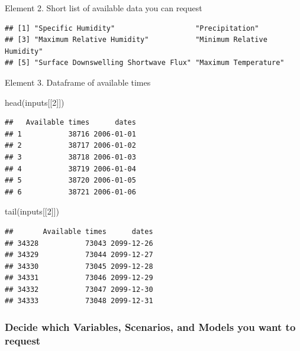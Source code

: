 \documentclass[
  paper=a4,
  ,captions=tableheading
]{scrartcl}
\newenvironment{Shaded}{\begin{snugshade}}{\end{snugshade}}
\newcommand{\DecValTok}[1]{\textcolor[rgb]{0.00,0.00,0.81}{#1}}
\newcommand{\FunctionTok}[1]{\textcolor[rgb]{0.00,0.00,0.00}{#1}}
\newcommand{\NormalTok}[1]{#1}
\newcommand{\SpecialCharTok}[1]{\textcolor[rgb]{0.00,0.00,0.00}{#1}}
\begin{document}
Element 2. Short list of available data you can request

\begin{Shaded}
\end{Shaded}

\begin{verbatim}
## [1] "Specific Humidity"                   "Precipitation"                      
## [3] "Maximum Relative Humidity"           "Minimum Relative Humidity"          
## [5] "Surface Downswelling Shortwave Flux" "Maximum Temperature"
\end{verbatim}

Element 3. Dataframe of available times

\begin{Shaded}
\begin{Highlighting}[]
\FunctionTok{head}\NormalTok{(inputs[[}\DecValTok{2}\NormalTok{]])}
\end{Highlighting}
\end{Shaded}

\begin{verbatim}
##   Available times      dates
## 1           38716 2006-01-01
## 2           38717 2006-01-02
## 3           38718 2006-01-03
## 4           38719 2006-01-04
## 5           38720 2006-01-05
## 6           38721 2006-01-06
\end{verbatim}

\begin{Shaded}
\begin{Highlighting}[]
\FunctionTok{tail}\NormalTok{(inputs[[}\DecValTok{2}\NormalTok{]])}
\end{Highlighting}
\end{Shaded}

\begin{verbatim}
##       Available times      dates
## 34328           73043 2099-12-26
## 34329           73044 2099-12-27
## 34330           73045 2099-12-28
## 34331           73046 2099-12-29
## 34332           73047 2099-12-30
## 34333           73048 2099-12-31
\end{verbatim}

\hypertarget{decide-which-variables-scenarios-and-models-you-want-to-request}{%
\subsubsection{Decide which Variables, Scenarios, and Models you want to
request}\label{decide-which-variables-scenarios-and-models-you-want-to-request}}
\end{document}
